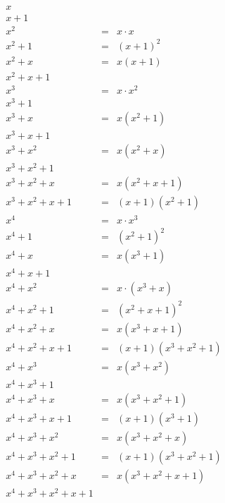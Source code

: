 \documentclass{jsarticle}
\begin{document}
\begin{eqnarray*}
    x \\
    x + 1\\
    x^2 &=& x\cdot x\\
    x^2 + 1 &=& (x + 1)^2\\
    x^2 + x &=& x(x + 1)\\
    x^2 + x + 1\\
    x^3 &=& x\cdot x^2\\
    x^3 + 1\\
    x^3 + x &=& x(x^2 + 1)\\
    x^3 + x + 1\\
    x^3 + x^2 &=& x(x^2 + x)\\
    x^3 + x^2 + 1\\
    x^3 + x^2 + x &=& x(x^2 + x + 1)\\
    x^3 + x^2 + x + 1 &=& (x+1)(x^2+1)\\
    x^4 &=& x\cdot x^3 \\
    x^4 + 1 &=& (x^2+1)^2\\
    x^4 + x &=& x(x^3 + 1)\\
    x^4 + x + 1\\
    x^4 + x^2 &=& x\cdot(x^3 + x)\\
    x^4 + x^2 + 1 &=& (x^2 + x + 1)^2\\
    x^4 + x^2 + x &=& x(x^3 + x + 1)\\
    x^4 + x^2 + x + 1 &=& (x + 1)(x^3+x^2+1)\\
    x^4 + x^3 &=& x(x^3 + x^2)\\
    x^4 + x^3 + 1\\
    x^4 + x^3 + x &=& x(x^3+x^2+1)\\
    x^4 + x^3 + x + 1 &=& (x + 1)(x^3 + 1)\\
    x^4 + x^3 + x^2 &=& x(x^3+x^2+x)\\
    x^4 + x^3 + x^2 + 1 &=& (x+1)(x^3+x^2+1)\\
    x^4 + x^3 + x^2 + x &=& x(x^3+x^2+x+1)\\
    x^4 + x^3 + x^2 + x + 1\\
\end{eqnarray*}
\end{document}
